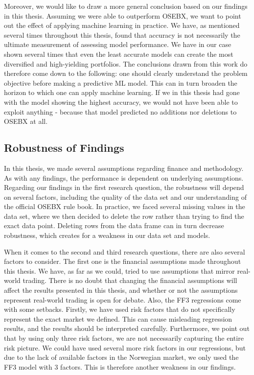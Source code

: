 Moreover, we would like to draw a more general conclusion based on our findings in this thesis. Assuming we were able to outperform OSEBX, we want to point out the effect of applying machine learning in practice. We have, as mentioned several times throughout this thesis, found that accuracy is not necessarily the ultimate measurement of assessing model performance. We have in our case shown several times that even the least accurate models can create the most diversified and high-yielding portfolios. The conclusions drawn from this work do therefore come down to the following: one should clearly understand the problem objective before making a predictive ML model. This can in turn broaden the horizon to which one can apply machine learning. If we in this thesis had gone with the model showing the highest accuracy, we would not have been able to exploit anything - because that model predicted no additions nor deletions to OSEBX at all.

\subsection{Robustness of Findings}

In this thesis, we made several assumptions regarding finance and methodology. As with any findings, the performance is dependent on underlying assumptions. 
Regarding our findings in the first research question, the robustness will depend on several factors, including the quality of the data set and our understanding of the official OSEBX rule book. In practice, we faced several missing values in the data set, where we then decided to delete the row rather than trying to find the exact data point. Deleting rows from the data frame can in turn decrease robustness, which creates for a weakness in our data set and models.

When it comes to the second and third research questions, there are also several factors to consider. The first one is the financial assumptions made throughout this thesis. We have, as far as we could, tried to use assumptions that mirror real-world trading. There is no doubt that changing the financial assumptions will affect the results presented in this thesis, and whether or not the assumptions represent real-world trading is open for debate. Also, the FF3 regressions come with some setbacks. Firstly, we have used risk factors that do not specifically represent the exact market we defined. This can cause misleading regression results, and the results should be interpreted carefully. Furthermore, we point out that by using only three risk factors, we are not necessarily capturing the entire risk picture. We could have used several more risk factors in our regressions, but due to the lack of available factors in the Norwegian market, we only used the FF3 model with 3 factors. This is therefore another weakness in our findings. 


